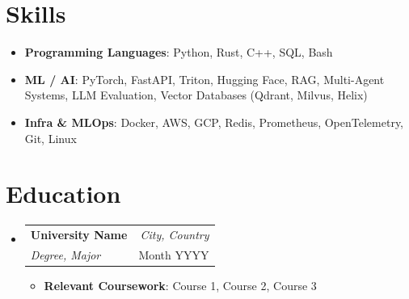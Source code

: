 \documentclass[10pt, letterpaper]{extarticle}
\makeatletter
\newcommand{\resumeItem}[1]{\item{#1}}
\newcommand{\resumeSubheading}[4]{
  \item
    \begin{tabular*}{1.0\textwidth}[t]{l@{\extracolsep{\fill}}r}
      \textbf{#1} & \textit{#4} \\
      \textit{#3} & #2 \\
    \end{tabular*}\vspace{1.5pt}
}
\makeatother
\begin{document}
\section{Skills}

\begin{itemize}[label={}, leftmargin=0in]
    \item \textbf{Programming Languages}: Python, Rust, C++, SQL, Bash
    \item \textbf{ML / AI}: PyTorch, FastAPI, Triton, Hugging Face, RAG, Multi-Agent Systems, LLM Evaluation, Vector Databases (Qdrant, Milvus, Helix)
    \item \textbf{Infra \& MLOps}: Docker, AWS, GCP, Redis, Prometheus, OpenTelemetry, Git, Linux
\end{itemize}

\section{Education}

\begin{itemize}[label={}, leftmargin=0in]
    \resumeSubheading{University Name}{Month YYYY}{Degree, Major}{City, Country}
    \begin{itemize}[label={--}]
      \resumeItem{\textbf{Relevant Coursework}: Course 1, Course 2, Course 3}
    \end{itemize}
\end{itemize}
\end{document}
